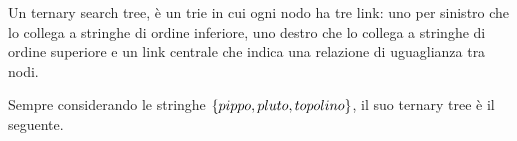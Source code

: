 \documentclass{subfiles}
\begin{document}
Un ternary search tree, è un trie in cui ogni nodo ha tre link: uno per sinistro che lo collega a stringhe di ordine inferiore,
uno destro che lo collega a stringhe di ordine superiore e un link centrale che indica una relazione di uguaglianza tra nodi.

Sempre considerando le stringhe \(\Set{pippo, pluto, topolino}\), il suo ternary tree è il seguente.

\end{document}
